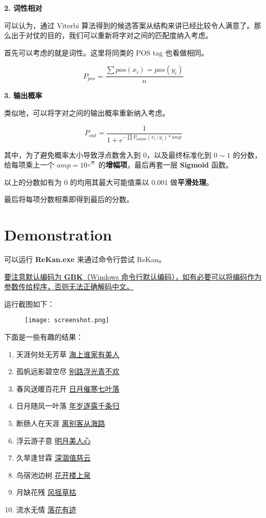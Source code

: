 \documentclass[12pt]{article}
\newcommand\given[1][]{\:#1\vert\:}
\begin{document}
\textbf{2. 词性相对}

可以认为，通过 Viterbi 算法得到的候选答案从结构来讲已经比较令人满意了。那么出于对仗的目的，我们可以重新将字对之间的匹配度纳入考虑。

首先可以考虑的就是词性。这里将同类的 POS tag 也看做相同。

\begin{equation}
P_{pos} = \frac{\sum pos(x_i) = pos(y_i)}{n}
\end{equation}

\textbf{3. 输出概率}

类似地，可以将字对之间的输出概率重新纳入考虑。

\begin{equation}
P_{out} = \frac{1}{1 + e^{-\prod P_{output}(x_i \given y_i) * amp}}
\end{equation}

其中，为了避免概率太小导致浮点数舍入到 $0$，以及最终标准化到 $0 \sim 1$ 的分数，给每项乘上一个 $amp = 10^{\sqrt{n}}$ 的\textbf{增幅项}，最后再套一层 \textbf{Sigmoid} 函数。

以上的分数如有为 $0$ 的均用其最大可能值乘以 $0.001$ 做\textbf{平滑处理}。

最后将每项分数相乘即得到最后的分数。

\newpage

\section{Demonstration}

可以运行 \textbf{ReKan.exe} 来通过命令行尝试 ReKan。

\uline{要注意默认编码为 \textbf{GBK}（Windows 命令行默认编码），如有必要可以将编码作为参数传给程序，否则无法正确解码中文。}

运行截图如下：

\begin{figure}[ht!]
\texttt{[image: screenshot.png]}
\end{figure}

下面是一些有趣的结果：

\begin{enumerate}
\item 天涯何处无芳草 \quad \uline{海上谁家有美人}
\item 孤帆远影碧空尽 \quad \uline{别路浮光青不欢}
\item 春风送暖百花开 \quad \uline{日月催寒七叶落}
\item 日月随风一叶落 \quad \uline{年岁逐露千条归}
\item 断肠人在天涯 \quad \uline{离别客从海路}
\item 浮云游子意 \quad \uline{明月美人心}
\item 久旱逢甘霖 \quad \uline{深涸值慈云}
\item 鸟宿池边树 \quad \uline{花开楼上泉}
\item 月缺花残 \quad \uline{风摇草枯}
\item 流水无情 \quad \uline{落花有迹}
\end{enumerate}
\end{document}

